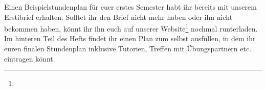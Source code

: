 Einen Beispielstundenplan für euer erstes Semester habt ihr bereits mit unserem
Erstibrief erhalten. Solltet ihr den Brief nicht mehr haben oder ihn nicht
bekommen haben, könnt ihr ihn euch auf unserer
Website\footnote{} nochmal runterladen.\\
Im hinteren Teil des Hefts findet ihr einen Plan zum selbst ausfüllen, in dem
ihr euren finalen Stundenplan inklusive
Tutorien, Treffen mit Übungspartnern etc. eintragen könnt.
